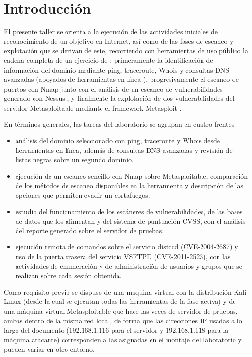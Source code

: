 \section*{Introducción}

El presente taller se orienta a la ejecución de las actividades iniciales de reconocimiento de un objetivo en Internet, así como de las fases de escaneo y explotación que se derivan de este, recorriendo con herramientas de uso público la cadena completa de un ejercicio de : primeramente la identificación de información del dominio mediante ping, traceroute, Whois y consultas DNS avanzadas (apoyados de herramientas en línea \cite{networktools,mxtoolbox}), progresivamente el escaneo de puertos con Nmap \cite{nmap-book} junto con el análisis de un escaneo de vulnerabilidades generado con Nessus \cite{nessus}, y finalmente la explotación de dos vulnerabilidades del servidor Metasploitable mediante el framework Metasploit \cite{metasploit-docs}.

En términos generales, las tareas del laboratorio se agrupan en cuatro frentes:

\begin{itemize}
  \item {} análisis del dominio seleccionado con ping, traceroute y Whois desde herramientas en línea, además de consultas DNS avanzadas y revisión de listas negras sobre un segundo dominio.
  \item {} ejecución de un escaneo sencillo con Nmap sobre Metasploitable, comparación de los métodos de escaneo disponibles en la herramienta y descripción de las opciones que permiten evadir un cortafuegos.
  \item {} estudio del funcionamiento de los escáneres de vulnerabilidades, de las bases de datos que los alimentan y del sistema de puntuación CVSS, con el análisis del reporte generado sobre el servidor de pruebas.
  \item {} ejecución remota de comandos sobre el servicio distccd (CVE-2004-2687) y uso de la puerta trasera del servicio VSFTPD (CVE-2011-2523), con las actividades de enumeración y de administración de usuarios y grupos que se realizan sobre cada sesión obtenida.
\end{itemize}

Como requisito previo se dispuso de una máquina virtual con la distribución Kali Linux (desde la cual se ejecutan todas las herramientas de la fase activa) y de una máquina virtual Metasploitable que hace las veces de servidor de pruebas, ambas dentro de la misma red local, de forma que las direcciones IP usadas a lo largo del documento (192.168.1.116 para el servidor y 192.168.1.118 para la máquina atacante) corresponden a las asignadas en el montaje del laboratorio y pueden variar en otro entorno.
